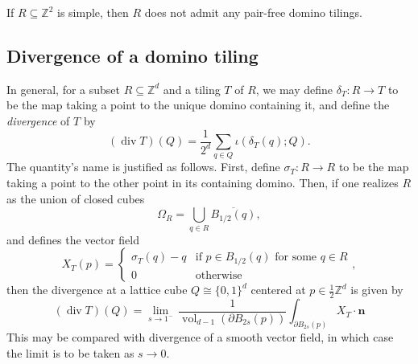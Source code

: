 \begin{corollary}\label{cor:regular-pair}
  If $R \subseteq \mathbb{Z}^2$ is simple, then $R$ does not admit any pair-free domino tilings.
\end{corollary}

\subsection{Divergence of a domino tiling}

In general, for a subset $R \subseteq \mathbb{Z}^d$ and a tiling $T$ of $R$, we may  define $\delta_T \colon R \to T$ to be the map taking a point to the unique domino containing it, and define the \emph{divergence} of $T$ by
\begin{equation}
  (\operatorname{div} T)(Q) = \frac{1}{2^{d}}\sum_{q \in Q} \iota(\delta_T(q); Q).
\end{equation}
The quantity's name is justified as follows. First, define $\sigma_T \colon R \to R$ to be the map taking a point to the other point in its containing domino. Then, if one realizes $R$ as the union of closed cubes
\begin{equation}
\Omega_R = \bigcup_{q \in R} \overline{B_{1/2}(q)},
\end{equation}
and defines the vector field
\begin{equation}
X_T(p) = 
\begin{cases}
  \sigma_T(q) - q &\text{if } p \in B_{1/2}(q) \text{ for some } q \in R \\
  0 &\text{otherwise}
\end{cases},
\end{equation}
then the divergence at a lattice cube $Q \cong \{0,1\}^d$ centered at $p \in \frac{1}{2}\mathbb{Z}^d$ is given by
\begin{equation}
(\operatorname{div} T)(Q) = \lim_{s \to 1^{-}} \, \frac{1}{\operatorname{vol}_{d-1} (\partial B_{2s}(p))} \int_{\partial B_{2s}(p)} X_T \cdot \mathbf{n}
\end{equation}
This may be compared with divergence of a smooth vector field, in which case the limit is to be taken as $s \to 0$.